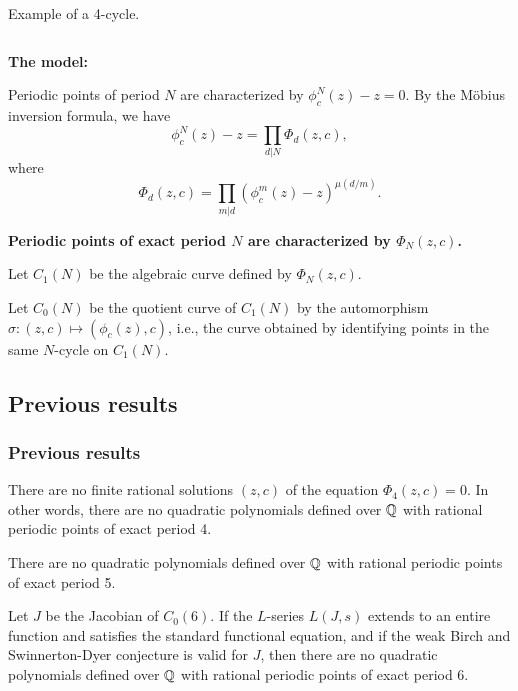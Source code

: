 \documentclass[aspectratio=1610]{beamer}
\begin{document}
\begin{frame}
\begin{minipage}{\textwidth}
\begin{columns}
\begin{column}{0.2\textwidth}
        Example of a 4-cycle.
      \end{column}
    \end{columns}
  \end{minipage}

  \pause

  \begin{minipage}{\textwidth}
    \textbf{The model:}

    Periodic points of period $N$ are characterized by $\phi_c^N(z) -
    z = 0$. By the M\"obius inversion formula, we have
    \[
    \phi_c^N(z) - z = \prod_{d|N} \Phi_d(z, c),
    \]
    where
    \[
    \Phi_d(z, c) = \prod_{m|d}(\phi_c^m(z) - z)^{\mu(d/m)}.
    \]

    \pause

    \textbf{Periodic points of exact period $N$ are characterized by
      $\Phi_N(z, c)$.}

    Let $C_1(N)$ be the algebraic curve defined by $\Phi_N(z, c)$.

    Let $C_0(N)$ be the quotient curve of $C_1(N)$ by the automorphism
    $\sigma: (z, c) \mapsto (\phi_c(z), c)$, i.e., the curve obtained
    by identifying points in the same $N$-cycle on $C_1(N)$.
  \end{minipage}
\end{frame}

\subsection{Previous results}

\begin{frame}
  \frametitle{Previous results}
  \begin{theorem}
    There are no finite rational solutions $(z, c)$ of the equation
    $\Phi_4(z, c) = 0$. In other words, there are no quadratic
    polynomials defined over $\mathbb{Q}$ with rational periodic points of
    exact period 4.
  \end{theorem}

  \begin{theorem}
    There are no quadratic polynomials defined over $\mathbb{Q}$ with rational
    periodic points of exact period 5.
  \end{theorem}

  \begin{theorem}
    Let $J$ be the Jacobian of $C_0(6)$. If the $L$-series $L(J,s)$
    extends to an entire function and satisfies the standard
    functional equation, and if the weak Birch and Swinnerton-Dyer
    conjecture is valid for $J$, then there are no quadratic
    polynomials defined over $\mathbb{Q}$ with rational periodic points of
    exact period 6.
  \end{theorem}
\end{frame}
\end{document}
